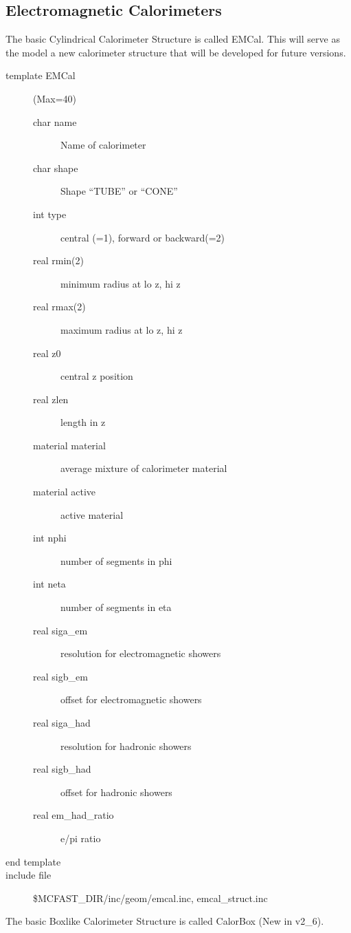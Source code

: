 \subsection{Electromagnetic Calorimeters}  

The basic Cylindrical Calorimeter Structure is called EMCal.  This will
serve as the model a new calorimeter structure that will be developed for future 
versions.  

\begin{description}
\item[{\rm template} EMCal](Max=40)
\begin{description}
\item[{\rm  char} name]   Name of calorimeter
\item[{\rm  char} shape]  Shape ``TUBE'' or ``CONE''
\item[{\rm  int}  type]   central (=1), forward or backward(=2)
\item[{\rm  real} rmin(2)]  minimum radius at lo z, hi z
\item[{\rm  real} rmax(2)]  maximum radius at lo z, hi z
\item[{\rm  real} z0]       central z position
\item[{\rm  real} zlen]     length in z
\item[{\rm  material} material]  average mixture of calorimeter material  
\item[{\rm  material} active]    active material
\item[{\rm  int} nphi]           number of segments in phi
\item[{\rm  int} neta]           number of segments in eta
\item[{\rm  real} siga\_em]      resolution for electromagnetic showers
\item[{\rm  real} sigb\_em]      offset for electromagnetic showers
\item[{\rm  real} siga\_had]     resolution for hadronic showers
\item[{\rm  real} sigb\_had]     offset for hadronic showers
\item[{\rm  real} em\_had\_ratio]  e/pi ratio 
\end{description}
\item[end template]
\item[include file] \$MCFAST\_DIR/inc/geom/emcal.inc, emcal\_struct.inc
\end{description}

The basic Boxlike Calorimeter Structure is called CalorBox (New in v2\_6).  

